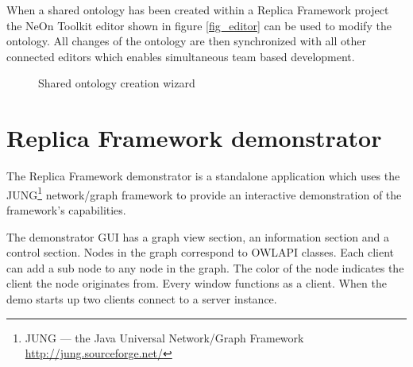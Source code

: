 When a shared ontology has been created within a Replica Framework project
the NeOn Toolkit editor shown in figure \ref{fig_editor} can be used to modify
the ontology. All changes
of the ontology are then synchronized with all other connected editors which
enables simultaneous team based development.
\begin{figure}[h]
        \caption{Shared ontology creation wizard}
        \centering
                        \hspace{1cm}
        \label{fig_sharedontowizard}
\end{figure}


\newpage


\section{Replica Framework demonstrator}
\label{replicademonstrator}
The Replica Framework demonstrator is a standalone application which uses the
JUNG\footnote{JUNG — the Java Universal Network/Graph Framework
\url{http://jung.sourceforge.net/}} network/graph framework to provide
an interactive demonstration of the framework's capabilities.

The demonstrator GUI has a graph view section, an information section
and a control section. Nodes in the graph correspond to OWLAPI classes.
Each client can add a sub node to any node in the graph. The color of
the node indicates the client the node originates from. Every window
functions as a client. When the demo starts up two clients connect to a
server instance.

